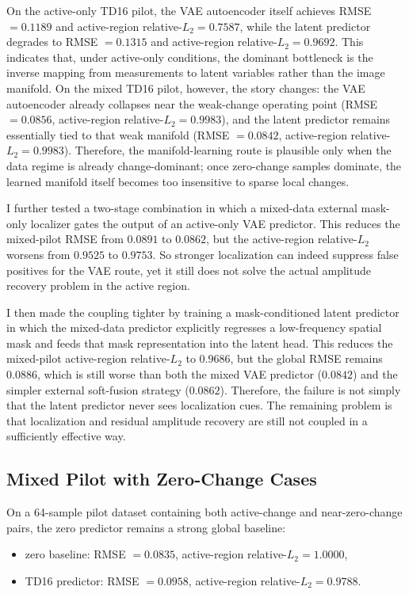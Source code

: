 \documentclass[11pt,a4paper]{article}
\begin{document}
On the active-only TD16 pilot, the VAE autoencoder itself achieves RMSE
$= 0.1189$ and active-region relative-$L_2 = 0.7587$, while the latent
predictor degrades to RMSE $= 0.1315$ and active-region relative-$L_2 = 0.9692$.
This indicates that, under active-only conditions, the dominant bottleneck is
the inverse mapping from measurements to latent variables rather than the image
manifold. On the mixed TD16 pilot, however, the story changes: the VAE
autoencoder already collapses near the weak-change operating point
(RMSE $= 0.0856$, active-region relative-$L_2 = 0.9983$), and the latent
predictor remains essentially tied to that weak manifold
(RMSE $= 0.0842$, active-region relative-$L_2 = 0.9983$). Therefore, the
manifold-learning route is plausible only when the data regime is already
change-dominant; once zero-change samples dominate, the learned manifold itself
becomes too insensitive to sparse local changes.

I further tested a two-stage combination in which a mixed-data external
mask-only localizer gates the output of an active-only VAE predictor. This
reduces the mixed-pilot RMSE from $0.0891$ to $0.0862$, but the active-region
relative-$L_2$ worsens from $0.9525$ to $0.9753$. So stronger localization can
indeed suppress false positives for the VAE route, yet it still does not solve
the actual amplitude recovery problem in the active region.

I then made the coupling tighter by training a mask-conditioned latent
predictor in which the mixed-data predictor explicitly regresses a low-frequency
spatial mask and feeds that mask representation into the latent head. This
reduces the mixed-pilot active-region relative-$L_2$ to $0.9686$, but the
global RMSE remains $0.0886$, which is still worse than both the mixed VAE
predictor ($0.0842$) and the simpler external soft-fusion strategy ($0.0862$).
Therefore, the failure is not simply that the latent predictor never sees
localization cues. The remaining problem is that localization and residual
amplitude recovery are still not coupled in a sufficiently effective way.

\subsection{Mixed Pilot with Zero-Change Cases}
On a 64-sample pilot dataset containing both active-change and near-zero-change
pairs, the zero predictor remains a strong global baseline:
\begin{itemize}[leftmargin=1.5em]
    \item zero baseline: RMSE $= 0.0835$, active-region relative-$L_2 = 1.0000$,
    \item TD16 predictor: RMSE $= 0.0958$, active-region relative-$L_2 = 0.9788$.
\end{itemize}
\end{document}
